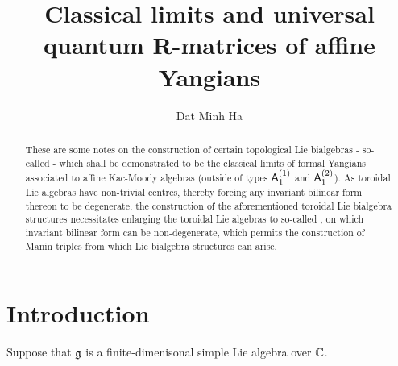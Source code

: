 

\setcounter{section}{-1}





    \title{Classical limits and universal quantum R-matrices of affine Yangians}
    
    \author{Dat Minh Ha}
    \maketitle
    
    \begin{abstract}
        These are some notes on the construction of certain topological Lie bialgebras - so-called  - which shall be demonstrated to be the classical limits of formal Yangians associated to affine Kac-Moody algebras (outside of types $\mathsf{A}_1^{(1)}$ and $\mathsf{A}_1^{(2)}$). As toroidal Lie algebras have non-trivial centres, thereby forcing any invariant bilinear form thereon to be degenerate, the construction of the aforementioned toroidal Lie bialgebra structures necessitates enlarging the toroidal Lie algebras to so-called , on which invariant bilinear form can be non-degenerate, which permits the construction of Manin triples from which Lie bialgebra structures can arise.
    \end{abstract}
    
    {
    \hypersetup{} 
    \tableofcontents %
    \listoftodos
    }

    \section{Introduction}
        Suppose that $\mathfrak{g}$ is a finite-dimenisonal simple Lie algebra over $\mathbb{C}$.
        
